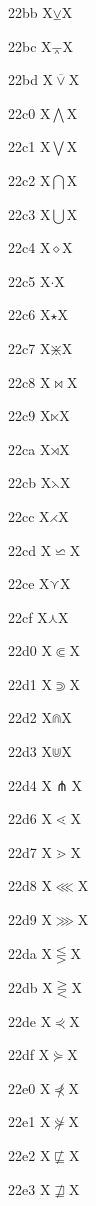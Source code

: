 \documentclass[11pt]{article}
\begin{document}
22bb X{\ensuremath{\veebar}}X

22bc X{\ensuremath{\barwedge}}X

22bd X{\ensuremath{\overline{\vee}}}X

22c0 X{\ensuremath{\bigwedge}}X

22c1 X{\ensuremath{\bigvee}}X

22c2 X{\ensuremath{\bigcap}}X

22c3 X{\ensuremath{\bigcup}}X

22c4 X{\ensuremath{\diamond}}X

22c5 X{\ensuremath{\cdot}}X

22c6 X{\ensuremath{\star}}X

22c7 X{\ensuremath{\divideontimes}}X

22c8 X{\ensuremath{\bowtie}}X

22c9 X{\ensuremath{\ltimes}}X

22ca X{\ensuremath{\rtimes}}X

22cb X{\ensuremath{\leftthreetimes}}X

22cc X{\ensuremath{\rightthreetimes}}X

22cd X{\ensuremath{\backsimeq}}X

22ce X{\ensuremath{\curlyvee}}X

22cf X{\ensuremath{\curlywedge}}X

22d0 X{\ensuremath{\Subset}}X

22d1 X{\ensuremath{\Supset}}X

22d2 X{\ensuremath{\Cap}}X

22d3 X{\ensuremath{\Cup}}X

22d4 X{\ensuremath{\pitchfork}}X

22d6 X{\ensuremath{\lessdot}}X

22d7 X{\ensuremath{\gtrdot}}X

22d8 X{\ensuremath{\lll}}X

22d9 X{\ensuremath{\ggg}}X

22da X{\ensuremath{\lesseqgtr}}X

22db X{\ensuremath{\gtreqless}}X

22de X{\ensuremath{\curlyeqprec}}X

22df X{\ensuremath{\curlyeqsucc}}X

22e0 X{\ensuremath{\not\curlyeqprec}}X

22e1 X{\ensuremath{\not\curlyeqsucc}}X

22e2 X{\ensuremath{\not\sqsubseteq}}X

22e3 X{\ensuremath{\not\sqsupseteq}}X
\end{document}
